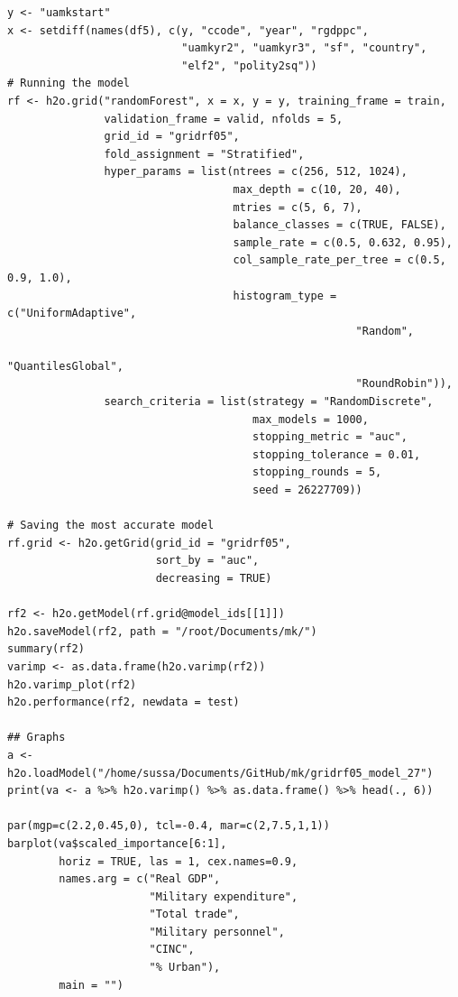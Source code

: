 \documentclass[a4paper,12pt]{article}
\begin{document}
\begin{verbatim}
y <- "uamkstart"
x <- setdiff(names(df5), c(y, "ccode", "year", "rgdppc",
                           "uamkyr2", "uamkyr3", "sf", "country",
                           "elf2", "polity2sq")) 
# Running the model
rf <- h2o.grid("randomForest", x = x, y = y, training_frame = train, 
               validation_frame = valid, nfolds = 5, 
               grid_id = "gridrf05",
               fold_assignment = "Stratified",
               hyper_params = list(ntrees = c(256, 512, 1024),
                                   max_depth = c(10, 20, 40),
                                   mtries = c(5, 6, 7),
                                   balance_classes = c(TRUE, FALSE),
                                   sample_rate = c(0.5, 0.632, 0.95),
                                   col_sample_rate_per_tree = c(0.5, 0.9, 1.0),
                                   histogram_type = c("UniformAdaptive",
                                                      "Random",
                                                      "QuantilesGlobal",
                                                      "RoundRobin")),
               search_criteria = list(strategy = "RandomDiscrete", 
                                      max_models = 1000, 
                                      stopping_metric = "auc", 
                                      stopping_tolerance = 0.01, 
                                      stopping_rounds = 5, 
                                      seed = 26227709)) 
                                      
# Saving the most accurate model
rf.grid <- h2o.getGrid(grid_id = "gridrf05",
                       sort_by = "auc",
                       decreasing = TRUE)

rf2 <- h2o.getModel(rf.grid@model_ids[[1]])
h2o.saveModel(rf2, path = "/root/Documents/mk/")
summary(rf2)
varimp <- as.data.frame(h2o.varimp(rf2))
h2o.varimp_plot(rf2)
h2o.performance(rf2, newdata = test)

## Graphs
a <- h2o.loadModel("/home/sussa/Documents/GitHub/mk/gridrf05_model_27")
print(va <- a %>% h2o.varimp() %>% as.data.frame() %>% head(., 6)) 

par(mgp=c(2.2,0.45,0), tcl=-0.4, mar=c(2,7.5,1,1))
barplot(va$scaled_importance[6:1],
        horiz = TRUE, las = 1, cex.names=0.9,
        names.arg = c("Real GDP", 
                      "Military expenditure",
                      "Total trade", 
                      "Military personnel",
                      "CINC", 
                      "% Urban"),
        main = "")


\end{verbatim}
\end{document}
